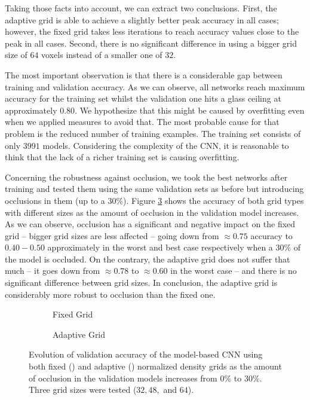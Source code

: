 Taking those facts into account, we can extract two conclusions. First, the adaptive grid is able to achieve a slightly better peak accuracy in all cases; however, the fixed grid takes less iterations to reach accuracy values close to the peak in all cases. Second, there is no significant difference in using a bigger grid size of $64$ voxels instead of a smaller one of $32$.

The most important observation is that there is a considerable gap between training and validation accuracy. As we can observe, all networks reach maximum accuracy for the training set whilst the validation one hits a glass ceiling at approximately $0.80$. We hypothesize that this might be caused by overfitting even when we applied measures to avoid that. The most probable cause for that problem is the reduced number of training examples. The training set consists of only $3991$ models. Considering the complexity of the \acs{CNN}, it is reasonable to think that the lack of a richer training set is causing overfitting.

Concerning the robustness against occlusion, we took the best networks after training and tested them using the same validation sets as before but introducing occlusions in them (up to a $30\%$). Figure \ref{fig:objrecog:3dcnn:experiments:25d_density_occlusion} shows the accuracy of both grid types with different sizes as the amount of occlusion in the validation model increases. As we can observe, occlusion has a significant and negative impact on the fixed grid -- bigger grid sizes are less affected -- going down from $\approx0.75$ accuracy to $0.40 - 0.50$ approximately in the worst and best case respectively when a $30\%$ of the model is occluded. On the contrary, the adaptive grid does not suffer that much -- it goes down from $\approx0.78$ to $\approx0.60$ in the worst case -- and there is no significant difference between grid sizes. In conclusion, the adaptive grid is considerably more robust to occlusion than the fixed one.

\begin{figure}[!htb]
	\centering
		\begin{subfigure}{0.49\textwidth}
		
		\caption{Fixed Grid}
		\label{subfig:objrecog:3dcnn:experiments:25d_fixed_density_occlusion}
	\end{subfigure}
	\begin{subfigure}{0.49\textwidth}
		
		\caption{Adaptive Grid}
		\label{subfig:objrecog:3dcnn:experiments:25d_adaptive_density_occlusion}
	\end{subfigure}
	\caption{Evolution of validation accuracy of the model-based \acs{CNN} using both fixed () and adaptive () normalized density grids as the amount of occlusion in the validation models increases from $0\%$ to $30\%$. Three grid sizes were tested ($32, 48, $ and $64$).}
	\label{fig:objrecog:3dcnn:experiments:25d_density_occlusion}
\end{figure}

